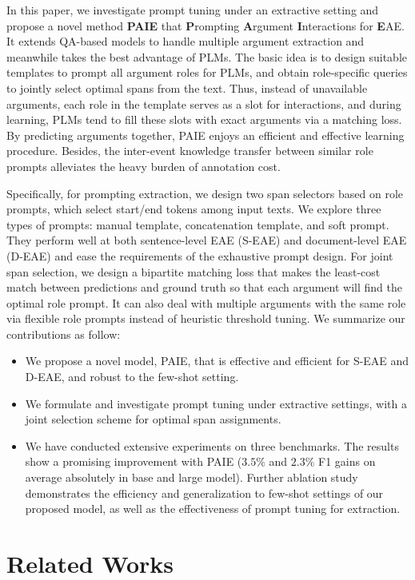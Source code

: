 In this paper, we investigate prompt tuning under an extractive setting and propose a novel method \textbf{PAIE} that \textbf{P}rompting \textbf{A}rgument \textbf{I}nteractions for \textbf{E}AE. It extends QA-based models to handle multiple argument extraction and meanwhile takes the best advantage of PLMs. The basic idea is to design suitable templates to prompt all argument roles for PLMs, and obtain role-specific queries to jointly select optimal spans from the text. Thus, instead of unavailable arguments, each role in the template serves as a slot for interactions, and during learning, PLMs tend to fill these slots with exact arguments via a matching loss. By predicting arguments together, PAIE enjoys an efficient and effective learning procedure. Besides, the inter-event knowledge transfer between similar role prompts alleviates the heavy burden of annotation cost.

Specifically, for prompting extraction, we design two span selectors based on role prompts, which select start/end tokens among input texts. We explore three types of prompts: manual template, concatenation template, and soft prompt. They perform well at both sentence-level EAE (S-EAE) and document-level EAE (D-EAE) and ease the requirements of the exhaustive prompt design. For joint span selection, we design a bipartite matching loss that makes the least-cost match between predictions and ground truth so that each argument will find the optimal role prompt. It can also deal with multiple arguments with the same role via flexible role prompts instead of heuristic threshold tuning.
We summarize our contributions as follow:
\begin{itemize}[leftmargin=*]
    \setlength{\parskip}{0pt}
   \setlength{\itemsep}{0pt plus 1pt}
    \item We propose a novel model, PAIE, that is effective and efficient for S-EAE and D-EAE, and robust to the few-shot setting.
    \item We formulate and investigate prompt tuning under extractive settings, with a joint selection scheme for optimal span assignments.
    \item We have conducted extensive experiments on three benchmarks. The results show a promising improvement with PAIE ($3.5\%$ and $2.3\%$ F1 gains on average absolutely in base and large model). Further ablation study demonstrates the efficiency and generalization to few-shot settings of our proposed model, as well as the effectiveness of prompt tuning for extraction. 
\end{itemize}\section{Related Works}
\label{sec:related}

